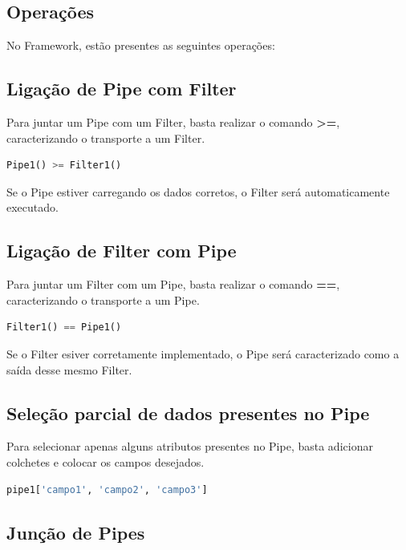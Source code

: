 \documentclass[portugues]{ic-tese}
\begin{document}
\subsection{Operações}

No Framework, estão presentes as seguintes operações:

\subsection{Ligação de Pipe com Filter}

Para juntar um Pipe com um Filter, basta realizar o comando \textbf{>=}, caracterizando o transporte a um Filter.

\begin{lstlisting}[language=Python, label=cod:PipeToFilter]
    Pipe1() >= Filter1()
\end{lstlisting}

Se o Pipe estiver carregando os dados corretos, o Filter será automaticamente executado.

\subsection{Ligação de Filter com Pipe}

Para juntar um Filter com um Pipe, basta realizar o comando \textbf{==}, caracterizando o transporte a um Pipe.

\begin{lstlisting}[language=Python, label=cod:FilterToPipe]
    Filter1() == Pipe1()
\end{lstlisting}

Se o Filter esiver corretamente implementado, o Pipe será caracterizado como a saída desse mesmo Filter.

\subsection{Seleção parcial de dados presentes no Pipe}

Para selecionar apenas alguns atributos presentes no Pipe, basta adicionar colchetes e colocar os campos desejados.

\begin{lstlisting}[language=Python, label=cod:PartialPipe]
    pipe1['campo1', 'campo2', 'campo3']
\end{lstlisting}

\subsection{Junção de Pipes}
\end{document}

